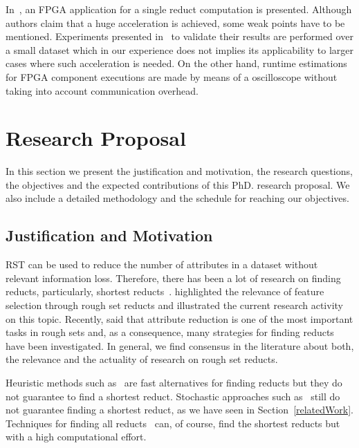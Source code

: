 \documentclass[authoryear,11pt]{elsarticle}
\begin{document}
  In~\citep{Grzes13,Kopczynski14}, an FPGA application for a single reduct computation is presented. Although
  authors claim that a huge acceleration is achieved, some weak points have to be mentioned. Experiments presented 
  in~\citep{Kopczynski14} to validate their results are performed over a small dataset which in our experience 
  does not implies its applicability to larger cases where such acceleration is needed. On the other hand, 
  runtime estimations for FPGA component executions are made by means of a oscilloscope without taking into 
  account communication overhead.
  
  
\section{Research Proposal}\label{ResearchProposal} 
 In this section we present the justification and motivation, the research questions, the objectives and the
 expected contributions of this PhD. research proposal. We also include a detailed methodology and the schedule 
 for reaching our objectives.

\subsection{Justification and Motivation}\label{Justification}
  RST can be used to reduce the number of attributes in a dataset without relevant information loss. 
  Therefore, there has been a lot of research on finding reducts, particularly, shortest 
  reducts~\citep{Jensen14}. \cite{Zheng14} highlighted the relevance of feature selection through rough
  set reducts and illustrated the current research activity on this topic. Recently, \cite{Jiang15} said that 
  attribute reduction is one of the most important tasks in rough sets and, as a consequence,  many strategies 
  for finding reducts have been investigated. In general, we find consensus in the literature about both,
  the relevance and the actuality of research on rough set reducts.
  
  Heuristic methods such as~\citep{Chouchoulas01,Jensen04,Zhong01} are fast alternatives for finding 
  reducts but they do not guarantee to find a shortest reduct. Stochastic approaches such as~\citep{Wroblewski95,
  Jensen03,Chen10,Wang07} still do not guarantee finding a shortest reduct, as we have seen in 
  Section~\ref{relatedWork}. Techniques for finding all reducts~\citep{Starzyk99,WangP07} can, of course, find 
  the shortest reducts but with a high computational effort.
  
\end{document}
